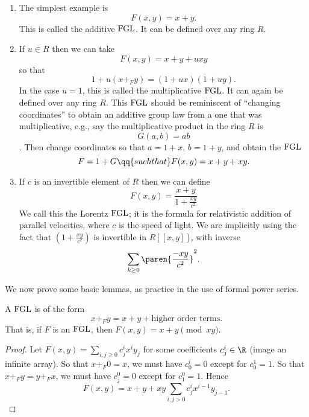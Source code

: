 \documentclass{ccg-topic}
\begin{document}
\begin{ex}
    \label{ex:concrete}
\hfill
\begin{enumerate}
    \item The simplest example is \[F(x, y) = x + y.\] This is called the additive $\mathrm{FGL}$. It can be defined over any ring $R$.
\item If $u \in R$ then we can take \[F(x,y) = x + y + uxy\] so that
\begin{equation*}
    1+u(x+_F y) = (1+ux)(1+uy).
\end{equation*}
In the case $u = 1$, this is called the multiplicative $\mathrm{FGL}$. It can again be defined over any ring $R$. This $\mathrm{FGL}$ should be reminiscent of ``changing coordinates'' to obtain an additive group law from a one that was multiplicative, e.g., say the multiplicative product in the ring $R$ is \[G(a,b) = ab\]. Then change coordinates so that $a = 1+x$, $b=1+y$, and obtain the $\mathrm{FGL}$ \[F = 1+G \qq{such that} F(x,y) = x + y + xy.\]
      
\item  If $c$ is an invertible element of $R$ then we can define 
\begin{equation*}
    F(x, y) = \frac{x+y}{1+\frac{xy}{c^2}}
\end{equation*}
We call this the Lorentz $\mathrm{FGL}$; it is the formula for relativistic addition of parallel velocities, where $c$ is the speed of light. We are implicitly using the fact that $(1 + \frac{xy}{c^2})$ is invertible in $R[[x, y]]$, with inverse \[\sum_{k\ge0 } \paren{\frac{-xy}{c^2}}^2.\]
\end{enumerate}
\end{ex}

We now prove some basic lemmas, as practice in the use of formal power series.

\begin{lem}
    \label{lem:characterizing_terms_of_small_order}
A $\mathrm{FGL}$ is of the form \[x+_F y = x + y + \text{higher order terms}.\] That is, if $F$ is an $\mathrm{FGL}$, then $F(x,y) = x + y \pmod{xy}$.
\end{lem}
\begin{proof}
Let $F(x,y) = \sum_{i,j \ge 0} c^i_j x^iy_j$ for some coefficients $c^i_j \in \R$ (image an infinite array). So that $x +_F 0 = x$, we must have $c^i_0 = 0$ except for $c^1_0 = 1$. So that $x+_F y = y +_F x$, we must have $c^0_j = 0$ except for $c^0_1 = 1$. Hence
\[
    F(x,y) = x + y + xy\sum_{i,j > 0}c^i_j x^{i-1}y_{j-1}.
\]
\end{proof}
\end{document}
